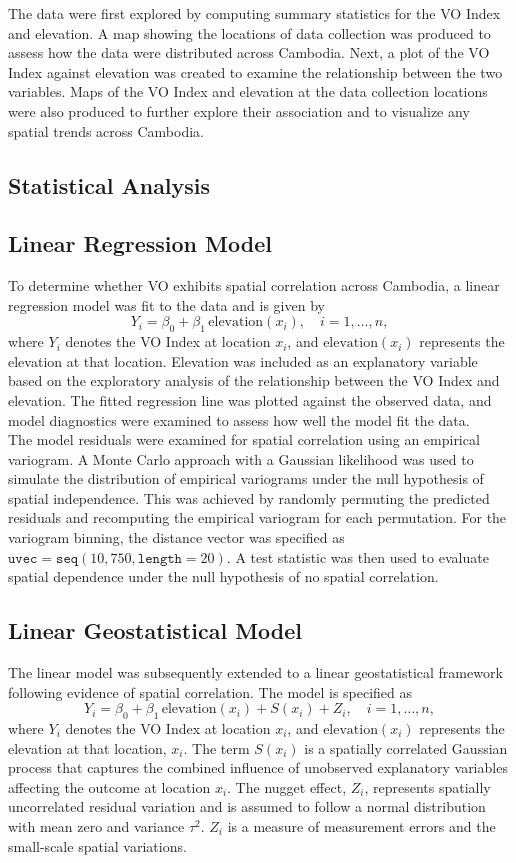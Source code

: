 \documentclass[12pt]{article}
\begin{document}
\noindent The data were first explored by computing summary statistics for the VO Index and elevation. A map showing the locations of data collection was produced to assess how the data were distributed across Cambodia. Next, a plot of the VO Index against elevation was created to examine the relationship between the two variables. Maps of the VO Index and elevation at the data collection locations were also produced to further explore their association and to visualize any spatial trends across Cambodia.

\subsection{Statistical Analysis}
\subsection{Linear Regression Model}
To determine whether VO exhibits spatial correlation across Cambodia, a linear regression model was fit to the data and is given by
\[
Y_i = \beta_0 + \beta_1 \,\text{elevation}(x_i), \quad i = 1, \ldots, n,
\]
where \(Y_i\) denotes the VO Index at location \(x_i\), and
\(\text{elevation}(x_i)\) represents the elevation at that location.
Elevation was included as an explanatory variable based on the exploratory
analysis of the relationship between the VO Index and elevation. The fitted regression line was plotted against the observed data, and model diagnostics were examined to assess how well the model fit the data. \\

\noindent The model residuals were examined for spatial correlation using an empirical variogram. A Monte Carlo approach with a Gaussian likelihood was used to simulate the distribution of empirical variograms under the null hypothesis of spatial independence. This was achieved by randomly permuting the predicted residuals and recomputing the empirical variogram for each permutation. For the variogram binning, the distance vector was specified as $\texttt{uvec} = \texttt{seq}(10, 750, \texttt{length} = 20)$. A test statistic was then used to evaluate spatial dependence under the null hypothesis of no spatial correlation.

\subsection{Linear Geostatistical Model}
The linear model was subsequently extended to a linear geostatistical framework following evidence of spatial correlation. The model is specified as
\[
Y_i = \beta_0 + \beta_1 \, \text{elevation}(x_i) + S(x_i) + Z_i, \quad i = 1, \ldots, n,
\]
where $Y_i$ denotes the VO Index at location $x_i$, and $\text{elevation}(x_i)$ represents the elevation at that location, $x_i$. The term $S(x_i)$ is a spatially correlated Gaussian process that captures the combined influence of unobserved explanatory variables affecting the outcome at location $x_i$. The nugget effect, $Z_i$, represents spatially uncorrelated residual variation and is assumed to follow a normal distribution with mean zero and variance $\tau^2$. $Z_i$ is a measure of measurement errors and the small-scale spatial variations.\\
\end{document}
